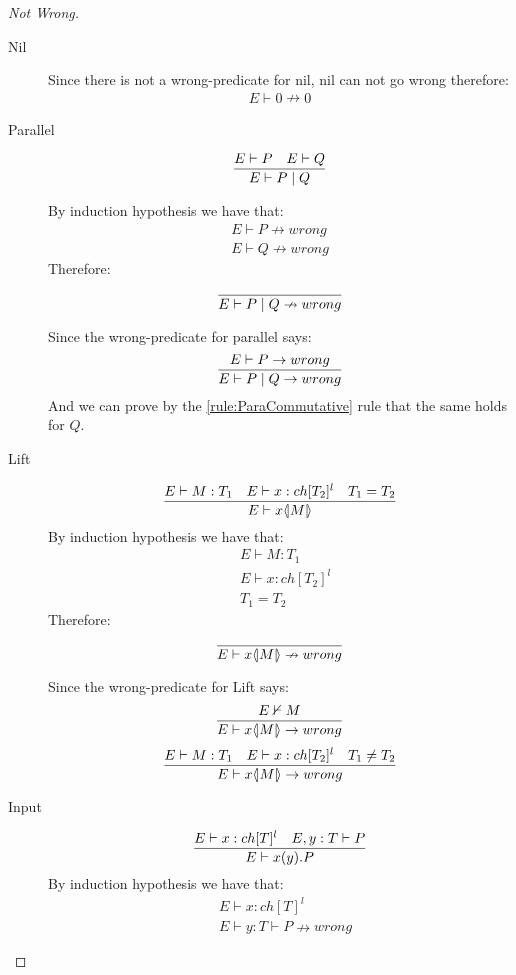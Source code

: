 \vspace{10mm}
\begin{proof}[Not Wrong]
	\begin{description}
	\item[Nil]
		Since there is not a wrong-predicate for nil, nil can not go wrong therefore:
		\begin{align*}
		E \vdash 0 \nrightarrow 0
		\end{align*}
	\item[Parallel]
		\begin{align*}
		\frac{E \vdash P \quad E \vdash Q }{E \vdash P \mid Q}
		\end{align*}
		
		By induction hypothesis we have that: 
		\begin{align*}
		E \vdash P \nrightarrow wrong\\
		E \vdash Q \nrightarrow wrong
		\end{align*}
		Therefore:
		\begin{align*}
		\frac{}{E \vdash P \mid Q \nrightarrow wrong}
		\end{align*}
		
		Since the wrong-predicate for parallel says:
		\begin{align*}
		\frac{E \vdash P \rightarrow wrong}{E \vdash P \mid Q \rightarrow wrong}
		\end{align*}
		And we can prove by the \ref{rule:ParaCommutative} rule that the same holds for $Q$.
	\item[Lift]
		\begin{align*}
		\frac{E \vdash M:T_1 \quad E \vdash x:ch[T_2]^l \quad T_1 = T_2}{E \vdash x \langle \! | M | \! \rangle}
		\end{align*}
		By induction hypothesis we have that:
		\begin{align*}
		&E \vdash M:T_1\\
		&E \vdash x:ch[T_2]^l\\
		&T_1 = T_2
		\end{align*}
		Therefore:
		\begin{align*}
		\frac{}{E \vdash x \langle \! | M | \! \rangle \nrightarrow wrong}
		\end{align*}
		
		Since the wrong-predicate for Lift says:
		\begin{align*}
		\frac{E \nvdash M}{E \vdash x \langle \! | M | \! \rangle \rightarrow wrong}
		\end{align*}
		\begin{align*}
		\frac{E \vdash M:T_1 \quad E \vdash x:ch[T_2]^l \quad T_1 \neq T_2}{E \vdash x \langle \! | M | \! \rangle \rightarrow wrong}
		\end{align*}
	\item[Input]
		\begin{align*}
		\frac{E \vdash x:ch[T]^l \quad E,y:T \vdash P}{E \vdash x(y).P}
		\end{align*}
		By induction hypothesis we have that:
		\begin{align*}
		&E \vdash x:ch[T]^l\\
		&E \vdash y:T \vdash P \nrightarrow wrong
		\end{align*}
		

\end{description}
\end{proof}
